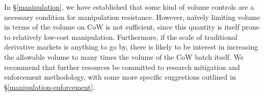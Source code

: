 \documentclass[a4paper,10pt]{article}
\theoremstyle{remark}
\begin{document}
In \S\ref{manipulation}, we have established that some kind of volume controls are a necessary condition for manipulation resistance.
%
However, na\"ively limiting volume in terms of the volume on CoW is not sufficient, since this quantity is itself prone to relatively low-cost manipulation.
%
Furthermore, if the scale of traditional derivative markets is anything to go by, there is likely to be interest in increasing the allowable volume to many times the volume of the CoW batch itself.
%
We recommend that further resources be committed to research mitigation and enforcement methodology, with some more specific suggestions outlined in \S\ref{manipulation-enforcement}.


\printbibliography
\end{document}
